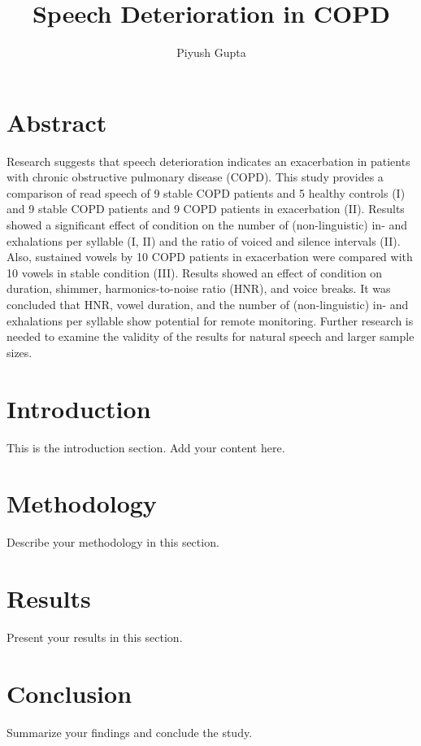 \documentclass{article}%
\title{Speech Deterioration in COPD}%
\author{Piyush Gupta}%
\date{}%
\begin{document}
%
\normalsize%
\maketitle%
\section{Abstract}%
\label{sec:Abstract}%

%
Research suggests that speech deterioration indicates an exacerbation in patients with chronic obstructive pulmonary disease (COPD). This study provides a comparison of read speech of 9 stable COPD patients and 5 healthy controls (I) and 9 stable COPD patients and 9 COPD patients in exacerbation (II). Results showed a significant effect of condition on the number of (non{-}linguistic) in{-} and exhalations per syllable (I, II) and the ratio of voiced and silence intervals (II). Also, sustained vowels by 10 COPD patients in exacerbation were compared with 10 vowels in stable condition (III). Results showed an effect of condition on duration, shimmer, harmonics{-}to{-}noise ratio (HNR), and voice breaks. It was concluded that HNR, vowel duration, and the number of (non{-}linguistic) in{-} and exhalations per syllable show potential for remote monitoring. Further research is needed to examine the validity of the results for natural speech and larger sample sizes.%
\section{Introduction}%
\label{sec:Introduction}%

%
This is the introduction section. Add your content here.%
\section{Methodology}%
\label{sec:Methodology}%

%
Describe your methodology in this section.%
\section{Results}%
\label{sec:Results}%

%
Present your results in this section.%
\section{Conclusion}%
\label{sec:Conclusion}%

%
Summarize your findings and conclude the study.%
\end{document}
